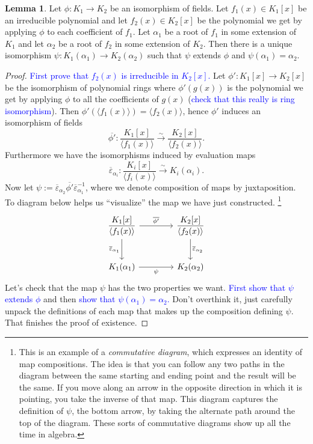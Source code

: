 \documentclass[11pt]{article}
\def\ve{\varepsilon}
\theoremstyle{definition}
\newtheorem{lemma}[theorem]{Lemma}
\numberwithin{equation}{subsection}
\newcommand{\blue}[1]{\textcolor{blue}{#1}}
\begin{document}
\begin{lemma}
\label{lemma: extend}
    Let $\phi : K_1 \to K_2$ be an isomorphism of fields.
    Let $f_1(x) \in K_1[x]$ be an irreducible polynomial and let $f_2(x) \in K_2[x]$ be the polynomial we get by applying $\phi$ to each coefficient of $f_1$.
    Let $\alpha_1$ be a root of $f_1$ in some extension of $K_1$ and let $\alpha_2$ be a root of $f_2$ in some extension of $K_2$.
    Then there is a unique isomorphism $\psi : K_1(\alpha_1) \to K_2(\alpha_2)$ such that $\psi$ extends $\phi$ and $\psi(\alpha_1) = \alpha_2$.
\end{lemma}

\begin{proof}
    \blue{First prove that $f_2(x)$ is irreducible in $K_2[x]$.}
    Let $\phi' : K_1[x] \to K_2[x]$ be the isomorphism of polynomial rings where $\phi'(g(x))$ is the polynomial we get by applying $\phi$ to all the coefficients of $g(x)$ (\blue{check that this really is ring isomorphism}).
    Then $\phi'(\langle f_1(x)\rangle) = \langle f_2(x)\rangle$, hence $\phi'$ induces an isomorphism of fields
    \[
        \overline{\phi'} : \frac{K_1[x]}{\langle f_1(x)\rangle} \xrightarrow{\sim} \frac{K_2[x]}{\langle f_2(x)\rangle}.
    \]
    Furthermore we have the isomorphisms induced by evaluation maps
    \[
        \overline{\ve}_{\alpha_i} : \frac{K_i[x]}{\langle f_i(x)\rangle} \xrightarrow{\sim} K_i(\alpha_i).
    \]
    Now let $\psi := \overline{\ve}_{\alpha_2} \overline{\phi'}\overline{\ve}_{\alpha_1}^{-1}$, where we denote composition of maps by juxtaposition.
    To diagram below helps us ``visualize'' the map we have just constructed.
    \footnote{This is an example of a \emph{commutative diagram}, which expresses an identity of map compositions.
    The idea is that you can follow any two paths in the diagram between the same starting and ending point and the result will be the same.
    If you move along an arrow in the opposite direction in which it is pointing, you take the inverse of that map.
    This diagram captures the definition of $\psi$, the bottom arrow, by taking the alternate path around the top of the diagram.
    These sorts of commutative diagrams show up all the time in algebra.}
    \[
        \begin{tikzcd}[row sep=2.5em, column sep=4em]
        \dfrac{K_1[x]}{\langle f_1(x) \rangle} \arrow[r, "\overline{\phi'}"] \arrow[d, "\overline{\ve}_{\alpha_1}"'] & \dfrac{K_2[x]}{\langle f_2(x) \rangle} \arrow[d, "\overline{\ve}_{\alpha_2}"] \\
        K_1(\alpha_1) \arrow[r, "\psi"'] & K_2(\alpha_2)
        \end{tikzcd}
    \]
    Let's check that the map $\psi$ has the two properties we want.
    \blue{First show that $\psi$ extends $\phi$} and then \blue{show that $\psi(\alpha_1) = \alpha_2$.}
    Don't overthink it, just carefully unpack the definitions of each map that makes up the composition defining $\psi$.
    That finishes the proof of existence.


\end{proof}
\end{document}
